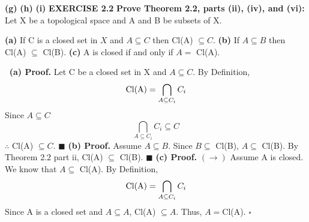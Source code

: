 \documentclass[12pt]{article}
\begin{document}
	\textbf{(g)}  \newline
	\textbf{(h)}  \newline
	\textbf{(i)}  \newline
	\newpage
	\noindent
	\textbf{EXERCISE 2.2} \textbf{Prove Theorem 2.2, parts (ii), (iv), and (vi):} Let X be a topological space and A and B be subsets of X.
	\begin{adjustwidth}{1cm}{0cm}
		\begin{flushleft}
			\textbf{(a)} If C is a closed set in \(X\) and \(A \subseteq C\) then Cl(A) \(\subseteq C\). \newline
			\textbf{(b)} If \(A \subseteq B\) then Cl(A) \(\subseteq\) Cl(B). \newline
			\textbf{(c)} A is closed if and only if \(A =\) Cl(A).
	\end{flushleft}
\end{adjustwidth}
\(\ \)
\newline
\textbf{(a) Proof.}
\newline
Let C be a closed set in X and \(A \subseteq C\).
\newline
By Definition,
\[\textup{Cl(A)} = \bigcap_{A \subseteq C_i}C_i\]
Since \(A \subseteq C\)
\[\bigcap_{A \subseteq C_i}C_i \subseteq C\]
\(\therefore\) Cl(A) \(\subseteq C\).
\newline \(\blacksquare\) \newline \newline
\textbf{(b) Proof.}
\newline
Assume \(A \subseteq B\).
\newline
Since \(B \subseteq\) Cl(B), \(A \subseteq\) Cl(B).
By Theorem 2.2 part ii, \newline
Cl(A) \(\subseteq\) Cl(B).
\newline \(\blacksquare\) \newline \newline
\textbf{(c) Proof.}
\newline
\((\rightarrow)\) Assume A is closed.
We know that \(A \subseteq\) Cl(A). \newline
By Definition,
\[\textup{Cl(A)} = \bigcap_{A \subseteq C_i}C_i\]
Since A is a closed set and \(A \subseteq A\),
\newline
Cl(A) \(\subseteq A\).
\newline
Thus, \(A =\)Cl(A).
\newline \(\square\) \newline
\end{document}
